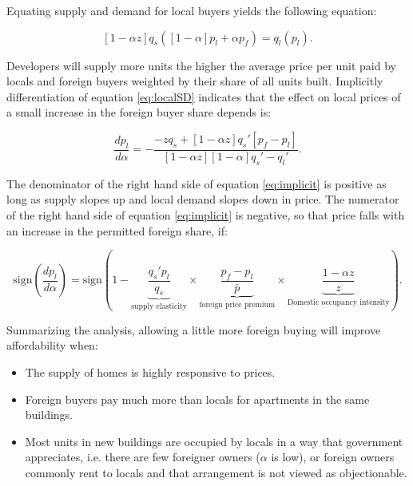 \documentclass[12pt]{article}
\begin{document}
Equating supply and demand for local buyers yields the following equation:

\begin{equation}
	\label{eq:localSD}
	\left[1-\alpha z\right]q_{s}\left(\left[1-\alpha\right]p_{l} + \alpha p_{f}\right) = q_{l}(p_{l}).
\end{equation}

Developers will supply more units the higher the average price per unit paid by locals and foreign buyers weighted by their share of all units built. Implicitly differentiation of equation \eqref{eq:localSD} indicates that the effect on local prices of a small increase in the foreign buyer share depends is:

\begin{equation}
	\label{eq:implicit}
	\frac{dp_{l}}{d\alpha} = -\frac{-zq_{s} + \left[1-\alpha z\right]q_{s}'\left[p_{f}-p_{l}\right]}{\left[1-\alpha z\right]\left[1-\alpha\right]q_{s}'-q_{l}'}.
\end{equation}

The denominator of the right hand side of equation \eqref{eq:implicit} is positive as long as supply slopes up and local demand slopes down in price. The numerator of the right hand side of equation \eqref{eq:implicit} is negative, so that price falls with an increase in the permitted foreign share, if:

\begin{equation}
	\label{eq:sign}
	\text{sign}\left(\frac{dp_{l}}{d\alpha}\right) = \text{sign}\left(1-\underbrace{\frac{q_{s}'p_{l}}{q_{s}}}_{\text{supply elasticity}}\times\underbrace{\frac{p_{f}-p_{l}}{\bar{p}}}_{\text{foreign price premium}}\times\underbrace{\frac{1-\alpha z}{z}}_{\text{Domestic occupancy intensity}}\right).
\end{equation}

Summarizing the analysis, allowing a little more foreign buying will improve affordability when:

\begin{itemize}
	\item The supply of homes is highly responsive to prices.
	\item Foreign buyers pay much more than locals for apartments in the same buildings.
	\item Most units in new buildings are occupied by locals in a way that government appreciates, i.e. there are few foreigner owners ($\alpha$ is low), or foreign owners commonly rent to locals and that arrangement is not viewed as objectionable.
\end{itemize}
\end{document}
